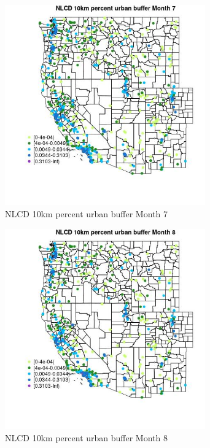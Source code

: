 \begin{figure} 
\centering  
\includegraphics[width=0.77\textwidth]{Code_Outputs/Report_ML_input_PM25_Step4_part_e_de_duplicated_aves_compiled_2019-05-14wNAs_MapObsMo7NLCD_10km_percent_urban_buffer.jpg} 
\caption{\label{fig:Report_ML_input_PM25_Step4_part_e_de_duplicated_aves_compiled_2019-05-14wNAsMapObsMo7NLCD_10km_percent_urban_buffer}NLCD 10km percent urban buffer Month 7} 
\end{figure} 
 

\clearpage 

\begin{figure} 
\centering  
\includegraphics[width=0.77\textwidth]{Code_Outputs/Report_ML_input_PM25_Step4_part_e_de_duplicated_aves_compiled_2019-05-14wNAs_MapObsMo8NLCD_10km_percent_urban_buffer.jpg} 
\caption{\label{fig:Report_ML_input_PM25_Step4_part_e_de_duplicated_aves_compiled_2019-05-14wNAsMapObsMo8NLCD_10km_percent_urban_buffer}NLCD 10km percent urban buffer Month 8} 
\end{figure} 
 

